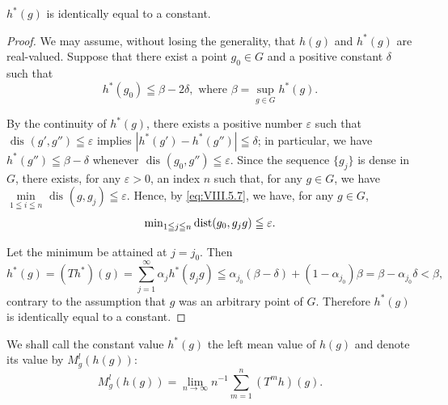 \begin{proposition}\label{prop:VIII.5.Proposition.2} $h^{*}(g)$ is identically equal to a constant. 
\end{proposition}

\begin{proof}
 We may assume, without losing the generality, that $h(g)$ and $h^{*}(g)$ are real-valued. Suppose that there exist a point $g_{0} \in G$ and a positive constant $\delta$ such that 
\[
h ^{*} (g _{0}) \leqq \beta - 2 \delta , \text{ where } \beta = \sup\limits _{g \in G} h ^{*} (g). \]

By the continuity of $h^*(g)$, there exists a positive number $\varepsilon$ such that $\text{ dis }(g', g'') \leqq \varepsilon$ implies $|h^*(g') - h^*(g'')| \leqq \delta$; in particular, we have $h^*(g'') \leqq \beta - \delta$ whenever $\text{ dis }(g_0, g'') \leqq \varepsilon$. Since the sequence $\{g_j\}$ is dense in $G$, there exists, for any $\varepsilon > 0$, an index $n$ such that, for any $g \in G$, we have $\min\limits_{1 \leqq i \leqq n} \text{ dis }(g, g_j) \leqq \varepsilon$. Hence, by \eqref{eq:VIII.5.7}, we have, for any $g \in G$, 
\[
\min\nolimits _{1 \leqq j \leqq n} \operatorname{dist} (g _{0}, g _{j} g) \leqq \varepsilon .
\]

Let the minimum be attained at $j = j_0$. Then 
\[
h ^{*} (g) = \left(T h ^{*}\right) (g) = \sum\limits_{j=1} ^{\infty} \alpha_{j} h ^{*} \left(g _{j} g\right) \leqq \alpha_ {j _{0}} (\beta - \delta) + \left(1 - \alpha_ {j _{0}}\right) \beta = \beta - \alpha_ {j _{0}} \delta < \beta ,
\]
contrary to the assumption that $g$ was an arbitrary point of $G$. Therefore $h^{*}(g)$ is identically equal to a constant. 
\end{proof}

\begin{definition}\label{def:VIII.5.Definition.3} We shall call the constant value $h^{*}(g)$ the left mean value of $h(g)$ and denote its value by $M_{g}^{l}(h(g))$: 
\begin{equation}\label{eq:VIII.5.18}
M _{g} ^{l} (h (g)) = \lim\limits _{n \rightarrow \infty} n ^{-1} \sum\limits_{m=1} ^{n} \left(T ^{m} h\right) (g).
\end{equation}
\end{definition}

